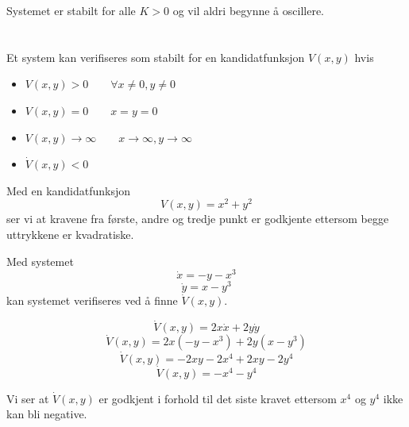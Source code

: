 \documentclass[norsk]{article}
\begin{document}
Systemet er stabilt for alle \(K > 0\) og vil aldri begynne å oscillere.

\section{}
Et system kan verifiseres som stabilt for en kandidatfunksjon \(V(x,y)\) hvis
\begin{itemize}
\item \(V(x, y) > 0 \qquad \forall x \neq 0, y \neq 0\)
\item \(V(x,y) = 0 \qquad x = y = 0\)
\item \(V(x,y) \rightarrow \infty \qquad x \rightarrow \infty, y \rightarrow \infty\)
\item \(\dot{V}(x,y) < 0 \)
\end{itemize}
Med en kandidatfunksjon \[V(x,y) = x^2 +  y^2\] ser vi at kravene fra første, andre og tredje punkt er godkjente ettersom begge uttrykkene er kvadratiske.

Med systemet \[\dot{x} = -y-x^3\] \[\dot{y} = x - y^3\] kan systemet verifiseres ved å finne \(\dot{V}(x, y)\).

\[\dot{V}(x,y) = 2x\dot{x} + 2y\dot{y}\]
\[\dot{V}(x,y) = 2x(-y-x^3) + 2y(x-y^3)\]
\[\dot{V}(x,y)=-2xy-2x^4 + 2xy-2y^4\]
\[\dot{V}(x,y) = -x^4-y^4\]

Vi ser at \(\dot{V}(x,y)\) er godkjent i forhold til det siste kravet ettersom \(x^4\) og \(y^4\) ikke kan bli negative.



\section{}
\end{document}
